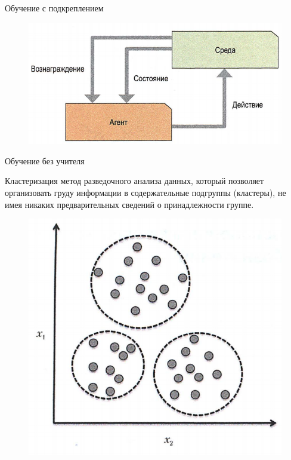\documentclass{beamer}
\begin{document}
\begin{frame}[t]{Обучение с подкреплением}
\begin{figure}[h]
\centering
\includegraphics[scale=0.5]{images/lec01-pic07.png}
\end{figure}
\end{frame}

\begin{frame}[t]{Обучение без учителя}
\begin{block}{Кластеризация}
метод разведочного анализа данных, который позволяет организовать груду информации в содержательные подгруппы (кластеры), не имея никаких предварительных сведений о принадлежности группе.
\end{block}
\begin{figure}[h]
\centering
\includegraphics[scale=0.35]{images/lec01-pic08.png}
\end{figure}
\end{frame}
\end{document}

